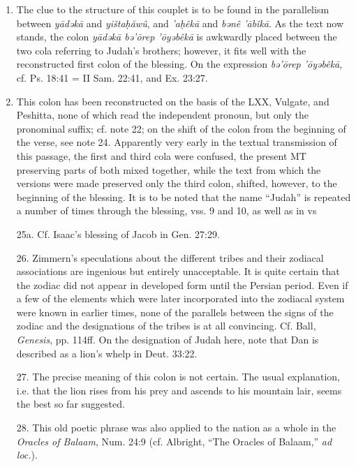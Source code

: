 \begin{enumerate}
\item
The clue to the structure of this couplet is to be found in the parallelism
between \emph{yādəkā} and \emph{yištaḥăwû}, and \emph{'aḥêkā} and
\emph{bənê 'ābîkā}. As the text now stands, the colon \emph{yādəkā bə'ōrep
'ōyəbêkā} is awkwardly placed between the two cola referring to Judah's
brothers; however, it fits well with the reconstructed first colon of the
blessing. On the expression \emph{bə'ōrep 'ōyəbêkā}, cf. Ps. 18:41 =
II Sam. 22:41, and Ex. 23:27.

\item
This colon has been reconstructed on the basis of the LXX, Vulgate, and
Peshitta, none of which read the independent pronoun, but only the pronominal
suffix; cf. note 22; on the shift of the colon from the beginning of the verse,
see note 24. Apparently very early in the textual transmission of this passage,
the first and third cola were confused, the present MT preserving parts of
both mixed together, while the text from which the versions were made
preserved only the third colon, shifted, however, to the beginning of the
blessing. It is to be noted that the name ``Judah'' is repeated a number of
times through the blessing, vss. 9 and 10, as well as in vs



25a. Cf. Isaac's blessing of Jacob in Gen. 27:29.

26. Zimmern's speculations about the different tribes and their zodiacal
associations are ingenious but entirely unacceptable. It is quite certain that
the zodiac did not appear in developed form until the Persian period. Even if
a few of the elements which were later incorporated into the zodiacal system
were known in earlier times, none of the parallels between the signs of the
zodiac and the designations of the tribes is at all convincing. Cf. Ball,
\emph{Genesis}, pp. 114ff. On the designation of Judah here, note that Dan is
described as a lion's whelp in Deut. 33:22.

27. The precise meaning of this colon is not certain. The usual explanation,
i.e. that the lion rises from his prey and ascends to his mountain lair, seems
the best so far suggested.

28. This old poetic phrase was also applied to the nation as a whole in the
\emph{Oracles of Balaam}, Num. 24:9 (cf. Albright, ``The Oracles of Balaam,''
\emph{ad loc.}).


\end{enumerate}
